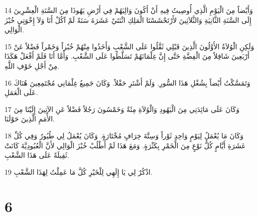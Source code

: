 \par 14 وَأَيْضاً مِنَ الْيَوْمِ الَّذِي أُوصِيتُ فِيهِ أَنْ أَكُونَ وَالِيَهُمْ فِي أَرْضِ يَهُوذَا مِنَ السَّنَةِ الْعِشْرِينَ إِلَى السَّنَةِ الثَّانِيَةِ وَالثَّلاَثِينَ لأَرْتَحْشَسْتَا الْمَلِكِ اثْنَتَيْ عَشَرَةَ سَنَةً لَمْ آكُلْ أَنَا وَلاَ إِخْوَتِي خُبْزَ الْوَالِي.
\par 15 وَلَكِنِ الْوُلاَةُ الأَوَّلُونَ الَّذِينَ قَبْلِي ثَقَّلُوا عَلَى الشَّعْبِ وَأَخَذُوا مِنْهُمْ خُبْزاً وَخَمْراً فَضْلاً عَنْ أَرْبَعِينَ شَاقِلاً مِنَ الْفِضَّةِ حَتَّى إِنَّ غِلْمَانَهُمْ تَسَلَّطُوا عَلَى الشَّعْبِ. وَأَمَّا أَنَا فَلَمْ أَفْعَلْ هَكَذَا مِنْ أَجْلِ خَوْفِ اللَّهِ.
\par 16 وَتَمَسَّكْتُ أَيْضاً بِشُغْلِ هَذَا السُّورِ. وَلَمْ أَشْتَرِ حَقْلاً. وَكَانَ جَمِيعُ غِلْمَانِي مُجْتَمِعِينَ هُنَاكَ عَلَى الْعَمَلِ.
\par 17 وَكَانَ عَلَى مَائِدَتِي مِنَ الْيَهُودِ وَالْوُلاَةِ مِئَةٌ وَخَمْسُونَ رَجُلاً فَضْلاً عَنِ الآتِينَ إِلَيْنَا مِنَ الأُمَمِ الَّذِينَ حَوْلَنَا.
\par 18 وَكَانَ مَا يُعْمَلُ لِيَوْمٍ وَاحِدٍ ثَوْراً وَسِتَّةَ خِرَافٍ مُخْتَارَةٍ. وَكَانَ يُعْمَلُ لِي طُيُورٌ وَفِي كُلِّ عَشَرَةِ أَيَّامٍ كُلُّ نَوْعٍ مِنَ الْخَمْرِ بِكَثْرَةٍ. وَمَعَ هَذَا لَمْ أَطْلُبْ خُبْزَ الْوَالِي لأَنَّ الْعُبُودِيَّةَ كَانَتْ ثَقِيلَةً عَلَى هَذَا الشَّعْبِ.
\par 19 اذْكُرْ لِي يَا إِلَهِي لِلْخَيْرِ كُلَّ مَا عَمِلْتُ لِهَذَا الشَّعْبِ.

\chapter{6}

